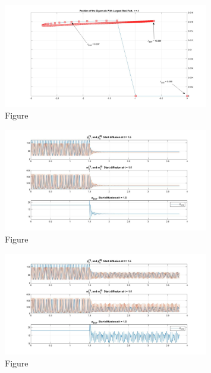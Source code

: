 \documentclass[12pt]{article}
\renewcommand{\(}{\left (}
\renewcommand{\)}{\right )}
\begin{document}
\begin{figure}[ht]
    \centering
	\begin{minipage}{0.99\textwidth}
		\centering
		\includegraphics[width=0.8\textwidth]{all_lambda_Ei2.jpg}
		\caption*{\small Figure}
	\end{minipage}
\end{figure}



\begin{figure}[ht]
    \centering
	\begin{minipage}{0.99\textwidth}
		\centering
		\includegraphics[width=0.8\textwidth]{PF_US.jpg}
		\caption*{\small Figure}
	\end{minipage}
\end{figure}


\begin{figure}[ht]
    \centering
	\begin{minipage}{0.99\textwidth}
		\centering
		\includegraphics[width=0.8\textwidth]{PF_UU.jpg}
		\caption*{\small Figure}
	\end{minipage}
\end{figure}
\end{document}
